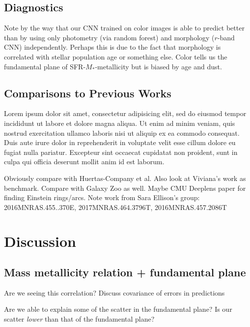 \documentclass[fleqn,usenatbib]{mnras}
\begin{document}
\subsection{Diagnostics}\label{sec:diagnostics}
Note by the way that our CNN trained on color images is able to predict better than by using only photometry (via random forest) and morphology ($r$-band CNN) independently.
Perhaps this is due to the fact that morphology is correlated with stellar population age or something else.
Color tells us the fundamental plane of SFR-$M_*$-metallicity but is biased by age and dust.

\subsection{Comparisons to Previous Works}\label{sec:previous work}
Lorem ipsum dolor sit amet, consectetur adipisicing elit, sed do eiusmod tempor incididunt ut labore et dolore magna aliqua. Ut enim ad minim veniam, quis nostrud exercitation ullamco laboris nisi ut aliquip ex ea commodo consequat. Duis aute irure dolor in reprehenderit in voluptate velit esse cillum dolore eu fugiat nulla pariatur. Excepteur sint occaecat cupidatat non proident, sunt in culpa qui officia deserunt mollit anim id est laborum.

Obviously compare with Huertas-Company et al.
Also look at Viviana's work as benchmark.
Compare with Galaxy Zoo as well.
Maybe CMU Deeplens paper for finding Einstein rings/arcs.
Note work from Sara Ellison's group: 
2016MNRAS.455..370E, 2017MNRAS.464.3796T, 2016MNRAS.457.2086T 

\section{Discussion} \label{sec:discussion}


\subsection{Mass metallicity relation + fundamental plane} 
Are we seeing this correlation? Discuss covariance of errors in predictions

Are we able to explain some of the scatter in the fundamental plane? Is our scatter \textit{lower} than that of the fundamental plane?
\end{document}

